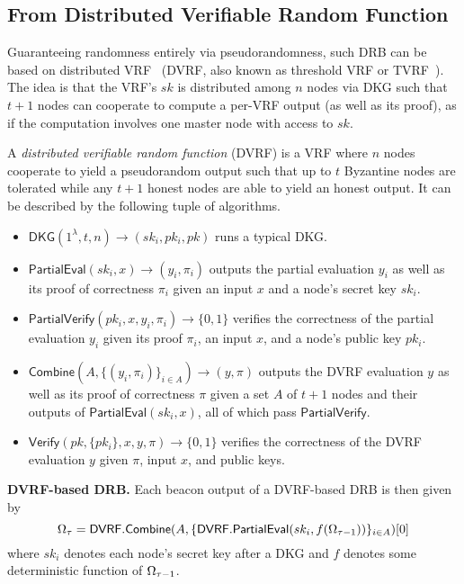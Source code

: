 \subsection{From Distributed Verifiable Random Function}
Guaranteeing randomness entirely via pseudorandomness, such DRB can be based on distributed VRF~\cite{hanke2018dfinity,galindo2020fully} (DVRF, also known as threshold VRF or TVRF~\cite{cascudomt}). The idea is that the VRF's $sk$ is distributed among $n$ nodes via DKG such that $t + 1$ nodes can cooperate to compute a per-\epoch VRF output (as well as its proof), as if the computation involves one master node with access to $sk$.

\begin{definition}
A \textit{distributed verifiable random function} (DVRF) is a VRF where $n$ nodes cooperate to yield a pseudorandom output such that up to $t$ Byzantine nodes are tolerated while any $t + 1$ honest nodes are able to yield an honest output. It can be described by the following tuple of algorithms.
\begin{itemize}
\item $\mathsf{DKG}(1^\lambda, t, n) \rightarrow (sk_i, pk_i, pk)$ runs a typical DKG.
\item $\mathsf{PartialEval}(sk_i, x) \rightarrow (y_i, \pi_i)$ outputs the partial evaluation $y_i$ as well as its proof of correctness $\pi_i$ given an input $x$ and a node's secret key $sk_i$.
\item $\mathsf{PartialVerify}(pk_i, x, y_i, \pi_i) \rightarrow \{0, 1\}$ verifies the correctness of the partial evaluation $y_i$ given its proof $\pi_i$, an input $x$, and a node's public key $pk_i$.
\item $\mathsf{Combine}(A, \{(y_i, \pi_i)\}_{i \in A}) \rightarrow (y, \pi)$ outputs the DVRF evaluation $y$ as well as its proof of correctness $\pi$ given a set $A$ of $t + 1$ nodes and their outputs of $\mathsf{PartialEval}(sk_i, x)$, all of which pass $\mathsf{PartialVerify}$.
\item $\mathsf{Verify}(pk, \{pk_i\}, x, y, \pi) \rightarrow \{0, 1\}$ verifies the correctness of the DVRF evaluation $y$ given $\pi$, input $x$, and public keys.
\end{itemize}
\end{definition}

\noindent\textbf{DVRF-based DRB.} Each beacon output of a DVRF-based DRB is then given by
\begingroup\makeatletter\def\f@size{8}\check@mathfonts
\[
\Omega_\tau = \mathsf{DVRF.Combine}(A, \{\mathsf{DVRF.PartialEval}(sk_i, f(\Omega_{\tau - 1}))\}_{i \in A})[0]
\]\endgroup
where $sk_i$ denotes each node's secret key after a DKG and $f$ denotes some deterministic function of $\Omega_{\tau - 1}$.


